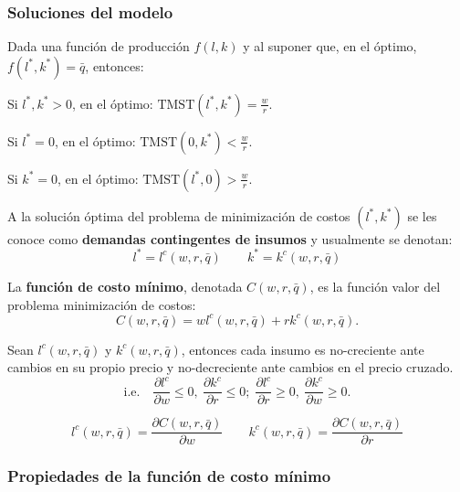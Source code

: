 \documentclass[8pt,a4paper]{extarticle}
\begin{document}
\begin{multicols}{3}
\subsubsection*{Soluciones del modelo}

Dada una función de producción $f(l, k)$ y al suponer que, en el óptimo, $f(l^*, k^*) = \bar{q}$, entonces:

\begin{bulletlist}
\item Si $l^*, k^* > 0$, en el óptimo: $\displaystyle \text{TMST} (l^*, k^*) = \frac{w}{r}$.
\item Si $l^* = 0$, en el óptimo: $\displaystyle \text{TMST} \left(0, k^* \right) < \frac{w}{r}$.
\item Si $k^* = 0$, en el óptimo: $\displaystyle \text{TMST} \left(l^* , 0\right) > \frac{w}{r}$.
\end{bulletlist}

\begin{boxdef}
A la solución óptima del problema de minimización de costos $(l^*, k^*)$ se les conoce como \textbf{demandas contingentes de insumos} y usualmente se denotan:
\[
	l^* = l^c (w, r, \bar{q}) \qquad k^* = k^c (w, r, \bar{q})
\] 
\end{boxdef}

\begin{boxdef}
La \textbf{función de costo mínimo}, denotada $C(w, r, \bar{q})$, es la función valor del problema minimización de costos:
	\[
		C(w, r, \bar{q}) = w l^c (w, r, \bar{q}) + r k^c (w, r, \bar{q})
	.\] 
\end{boxdef}

\begin{boxtheo}
	Sean $l^c (w, r, \bar{q})$ y $k^c (w, r, \bar{q})$, entonces cada insumo es no-creciente ante cambios en su propio precio y no-decreciente ante cambios en el precio cruzado.
	\[
		\text{i.e.}\quad \frac{\partial l^c}{\partial w} \le 0,\ \frac{\partial k^c}{\partial r} \le 0;\; \frac{\partial l^c}{\partial r} \ge 0,\ \frac{\partial k^c}{\partial w} \ge 0
	.\] 
\end{boxtheo}

\begin{boxlemma}
	\[
		l^c (w, r, \bar{q}) = \frac{\partial C(w, r, \bar{q})}{\partial w} \qquad k^c (w, r, \bar{q}) = \frac{\partial C(w, r, \bar{q})}{\partial r}
	\] 
\end{boxlemma}

\subsubsection{Propiedades de la función de costo mínimo}


\end{multicols}
\end{document}
